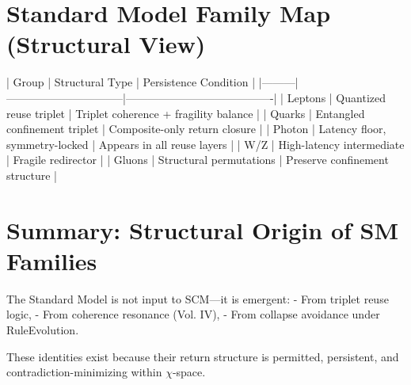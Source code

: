 \section{Standard Model Family Map (Structural View)} \label{sec:sm-map}

| Group   | Structural Type                | Persistence Condition                  |
|---------|--------------------------------|----------------------------------------|
| Leptons | Quantized reuse triplet        | Triplet coherence + fragility balance  |
| Quarks  | Entangled confinement triplet  | Composite-only return closure          |
| Photon  | Latency floor, symmetry-locked | Appears in all reuse layers            |
| W/Z     | High-latency intermediate      | Fragile redirector                     |
| Gluons  | Structural permutations         | Preserve confinement structure         |

\section{Summary: Structural Origin of SM Families} \label{sec:sm-summary}

The Standard Model is not input to SCM—it is emergent:
- From triplet reuse logic,
- From coherence resonance (Vol. IV),
- From collapse avoidance under RuleEvolution.

These identities exist because their return structure is permitted, persistent, and contradiction-minimizing within $\chi$-space.

